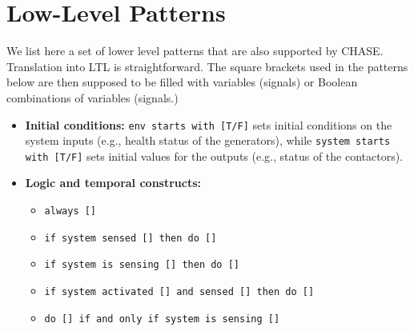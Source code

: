 \documentclass[journal]{IEEEtran}
\begin{document}
\section{Low-Level Patterns}

We list here a set of lower level patterns that are also supported by CHASE. Translation into LTL is straightforward. The square brackets used in the patterns below are then supposed to be filled with variables (signals) or Boolean combinations of variables (signals.) 
\begin{itemize}
\item \textbf{Initial conditions:} \texttt{env starts with [T/F]} sets initial conditions on the system inputs (e.g.,  health status of the generators), while \texttt{system starts with [T/F]} sets initial values for the outputs (e.g., status of the contactors).
\item \textbf{Logic and temporal constructs:} 
\begin{itemize} 
\item \texttt{always []} 
\item \texttt{if system sensed [] then do []}
\item \texttt{if system is sensing [] then do []} 
\item \texttt{if system activated [] and sensed [] then do []} 
\item \texttt{do [] if and only if system is sensing []}
\end{itemize}

\end{itemize}
\end{document}
